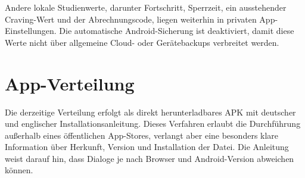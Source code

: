 Andere lokale Studienwerte, darunter Fortschritt, Sperrzeit, ein ausstehender Craving-Wert und der Abrechnungscode, liegen weiterhin in privaten App-Einstellungen. Die automatische Android-Sicherung ist deaktiviert, damit diese Werte nicht über allgemeine Cloud- oder Gerätebackups verbreitet werden.

\section{App-Verteilung}
Die derzeitige Verteilung erfolgt als direkt herunterladbares APK mit deutscher und englischer Installationsanleitung. Dieses Verfahren erlaubt die Durchführung außerhalb eines öffentlichen App-Stores, verlangt aber eine besonders klare Information über Herkunft, Version und Installation der Datei. Die Anleitung weist darauf hin, dass Dialoge je nach Browser und Android-Version abweichen können.
